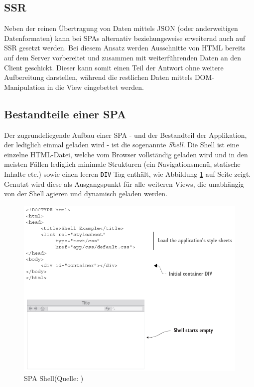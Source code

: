\documentclass[a4paper,12pt,twoside]{scrreprt}
\begin{document}
\subsection{\acl{SSR}}
\label{subsec:ssr}
Neben der reinen Übertragung von Daten mittels \acs{JSON} (oder anderweitigen Datenformaten) kann bei \acsp{SPA} alternativ beziehungsweise erweiternd auch auf \ac{SSR} gesetzt werden. Bei diesem Ansatz werden Ausschnitte von HTML bereits auf dem Server vorbereitet und zusammen mit weiterführenden Daten an den Client geschickt. Dieser kann somit einen Teil der Antwort ohne weitere Aufbereitung darstellen, während die restlichen Daten mittels \ac{DOM}-Manipulation in die View eingebettet werden. \parencite[][Seite 7]{scott_spa_2015}

\subsection{Bestandteile einer \acs{SPA}}
\label{subsec:spa-bestandteile}
Der zugrundeliegende Aufbau einer \ac{SPA} - und der Bestandteil der Applikation, der lediglich einmal geladen wird - ist die sogenannte \textit{Shell}. Die Shell ist eine einzelne HTML-Datei, welche vom Browser vollständig geladen wird und in den meisten Fällen lediglich minimale Strukturen (ein Navigationsmenü, statische Inhalte etc.) sowie einen leeren \texttt{DIV} Tag enthält, wie Abbildung \ref{fig:spa-shell} auf Seite \pageref{fig:spa-overview} zeigt. Genutzt wird diese als Ausgangspunkt für alle weiteren Views, die unabhängig von der Shell agieren und dynamisch geladen werden. \parencite[][Seite 8]{scott_spa_2015}

\begin{figure}[ht]
    \centering
    \includegraphics[scale=0.45]{images/Scott_SPA-shell.png}
    \caption[\acs{SPA} Shell]{\acs{SPA} Shell\newline(Quelle: \cite[][Seite 8]{scott_spa_2015})}
    \label{fig:spa-shell}
\end{figure}
\end{document}
